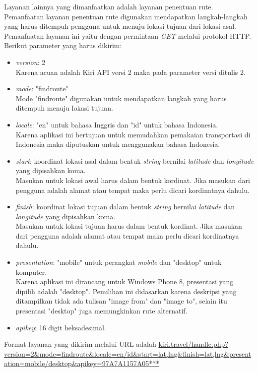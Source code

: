 Layanan lainnya yang dimanfaatkan adalah layanan penentuan rute. Pemanfaatan layanan penentuan rute digunakan mendapatkan langkah-langkah yang harus ditempuh pengguna untuk menuju lokasi tujuan dari lokasi asal. Pemanfaatan layanan ini yaitu dengan permintaan \textit{GET} melalui protokol HTTP. Berikut parameter yang harus dikirim:
\begin{itemize}
	\item \textit{version}: 2 \\
	Karena acuan adalah Kiri API versi 2 maka pada parameter versi ditulis 2.
	\item \textit{mode}: "findroute" \\
	Mode "findroute" digunakan untuk mendapatkan langkah yang harus ditempuh menuju lokasi tujuan.
	\item \textit{locale}: "en" untuk bahasa Inggris dan "id" untuk bahasa Indonesia. \\
	Karena aplikasi ini bertujuan untuk memudahkan pemakaian transportasi di Indonesia maka diputuskan untuk menggunakan bahasa Indonesia.
	\item \textit{start}: koordinat lokasi asal dalam bentuk \textit{string} bernilai \textit{latitude} dan \textit{longitude} yang dipisahkan koma. \\
	Masukan untuk lokasi awal harus dalam bentuk kordinat. Jika masukan dari pengguna adalah alamat atau tempat maka perlu dicari kordinatnya dahulu.
	\item \textit{finish}: koordinat lokasi tujuan dalam bentuk \textit{string} bernilai \textit{latitude} dan \textit{longitude} yang dipisahkan koma. \\
	Masukan untuk lokasi tujuan harus dalam bentuk kordinat. Jika masukan dari pengguna adalah alamat atau tempat maka perlu dicari kordinatnya dahulu.
	\item \textit{presentation}: "mobile" untuk perangkat \textit{mobile} dan "desktop" untuk komputer. \\
	Karena aplikasi ini dirancang untuk Windows Phone 8, presentasi yang dipilih adalah "desktop". Pemilihan ini didasarkan karena deskripsi yang ditampilkan tidak ada tulisan "image from" dan "image to", selain itu presentasi "desktop" juga memungkinkan rute alternatif. 
	\item \textit{apikey}: 16 digit heksadesimal.
\end{itemize}

Format layanan yang dikirim melalui URL adalah \url{kiri.travel/handle.php?version=2&mode=findroute&locale=en/id&start=lat,lng&finish=lat,lng&presentation=mobile/desktop&apikey=97A7A1157A05***}

